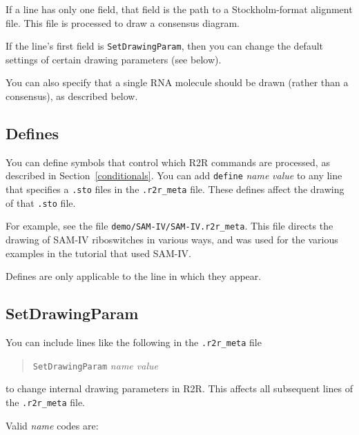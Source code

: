 \documentclass[letterpaper,12pt]{report}
\newcommand{\example}[1]{
\begin{quote}
{\raggedright
#1
}
\end{quote}
}
\begin{document}
If a line has only one field, that field is the path to a Stockholm-format
alignment file.  This file is processed to draw a consensus diagram.

If the line{\textquoteright}s first field is {\tt SetDrawingParam}, then you
can change the default settings of certain drawing parameters (see below).

You can also specify that a single RNA molecule should be drawn (rather than a consensus),
as described below.

\subsection{Defines}

You can define symbols that control which R2R commands are processed, as described in Section~\ref{conditionals}.
You can add {\tt define} {\it name} {\it value} to any line that specifies a {\tt .sto} files in the {\tt .r2r\_meta} file.  These defines affect the drawing of that {\tt .sto} file.

For example, see the file {\tt demo/SAM-IV/SAM-IV.r2r\_meta}.  This file directs the drawing of SAM-IV riboswitches in various ways, and was used for the various examples in the tutorial that used SAM-IV.

Defines are only applicable to the line in which they appear.

\subsection{SetDrawingParam}
\label{SetDrawingParam}

You can include lines like the following in the {\tt .r2r\_meta} file
\example{
{\tt SetDrawingParam} \textit{ name  value}
}
to change internal drawing parameters in R2R.
This affects all subsequent lines of the {\tt .r2r\_meta} file.

Valid \textit{name} codes are:
\end{document}
